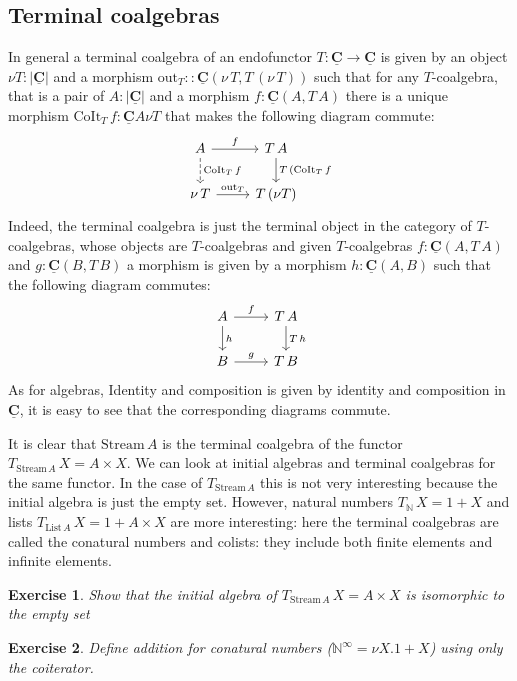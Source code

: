 \documentclass{article}
\newcommand{\cat}[1]{\underline{\mathbf{#1}}}
\newcommand{\obj}[1]{|#1|}
\newcommand{\homC}[3]{\cat{#1}(#2,#3)}
\newcommand{\Nat}{\mathbb{N}}
\newcommand{\List}{\mathrm{List}}
\newcommand{\out}{\mathrm{out}}
\newcommand{\Stream}{\mathrm{Stream}}
\newcommand{\CoIt}{\mathrm{CoIt}}
\newtheorem{exercise}{Exercise}
\begin{document}
\subsection{Terminal coalgebras}
\label{sec:terminal-coalgebras}

In general a terminal coalgebra of an endofunctor $T : \cat{C} \to \cat{C}$ is given by an object $\nu T : \obj{\cat{C}}$ and a morphism $\out_T : : \homC{C}{\nu\,T}{T\,(\nu\,T)}$ such that for any $T$-coalgebra, that is a pair of $A : \obj{\cat{C}}$ and a morphism 
$f : \homC{C}{A}{T\,A}$ there is a unique morphism $\CoIt_T \,f: \cat{C}{A}{\nu T}$
that makes the following diagram commute:
\[\begin{tikzcd}
A \arrow[d,"\CoIt_T \, f" right,dashrightarrow] \arrow[r,"f"]  & T\,A \arrow[d, "T\, (\CoIt_T \, f"]\\
\nu\,T  \arrow[r,"\out_T"] & T\,(\nu T) 
\end{tikzcd}\]  
Indeed, the terminal coalgebra is just the terminal object in the category of $T$-coalgebras, whose objects are $T$-coalgebras and given $T$-coalgebras $f : \homC{C}{A}{T\,A}$ and $g : \homC{C}{B}{T\,B}$ a morphism is given by a morphism $h : \homC{C}{A}{B}$ such that the following diagram commutes:
\[\begin{tikzcd}
 A \arrow[d,"h"] \arrow[r,"f"]  & T\,A \arrow[d,"T\,h"]\\
 B \arrow[r,"g"] & T\,B 
\end{tikzcd}\]  
As for algebras, Identity and composition is given by identity and composition in $\cat{C}$, it is easy to see that the corresponding diagrams commute. 

It is clear that $\Stream\,A$ is the terminal coalgebra of the functor $T_{\Stream\,A}\,X = A \times X$. We can look at initial algebras and terminal coalgebras for the same functor. In the case of $T_{\Stream\,A}$  this is not very interesting because the initial algebra is just the empty set. However, natural numbers $T_\Nat\,X = 1+X$ and lists $T_{\List\,A}\,X = 1 + A \times X$ are more interesting: here the terminal coalgebras are called the conatural numbers and colists: they include both finite elements and infinite elements. 

\begin{exercise}
  Show that the initial algebra of $T_{\Stream\,A}\,X = A \times X$ is isomorphic to the empty set
\end{exercise}

\begin{exercise}
  Define addition for conatural numbers ($\Nat^\infty = \nu X.1+X$) using only the coiterator.
\end{exercise}
\end{document}
